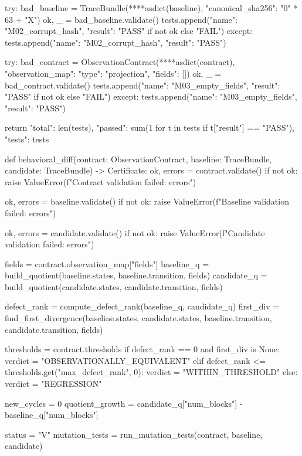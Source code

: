     try:
        bad_baseline = TraceBundle(**{**asdict(baseline), "canonical_sha256": "0" * 63 + "X"})
        ok, _ = bad_baseline.validate()
        tests.append({"name": "M02_corrupt_hash", "result": "PASS" if not ok else "FAIL"})
    except:
        tests.append({"name": "M02_corrupt_hash", "result": "PASS"})
    
    try:
        bad_contract = ObservationContract(**{**asdict(contract), "observation_map": {"type": "projection", "fields": []}})
        ok, _ = bad_contract.validate()
        tests.append({"name": "M03_empty_fields", "result": "PASS" if not ok else "FAIL"})
    except:
        tests.append({"name": "M03_empty_fields", "result": "PASS"})
    
    return {
        "total": len(tests),
        "passed": sum(1 for t in tests if t["result"] == "PASS"),
        "tests": tests
    }

def behavioral_diff(contract: ObservationContract, baseline: TraceBundle, 
                    candidate: TraceBundle) -> Certificate:
    ok, errors = contract.validate()
    if not ok:
        raise ValueError(f"Contract validation failed: {errors}")
    
    ok, errors = baseline.validate()
    if not ok:
        raise ValueError(f"Baseline validation failed: {errors}")
    
    ok, errors = candidate.validate()
    if not ok:
        raise ValueError(f"Candidate validation failed: {errors}")
    
    fields = contract.observation_map["fields"]
    baseline_q = build_quotient(baseline.states, baseline.transition, fields)
    candidate_q = build_quotient(candidate.states, candidate.transition, fields)
    
    defect_rank = compute_defect_rank(baseline_q, candidate_q)
    first_div = find_first_divergence(baseline.states, candidate.states, baseline.transition, candidate.transition, fields)
    
    thresholds = contract.thresholds
    if defect_rank == 0 and first_div is None:
        verdict = "OBSERVATIONALLY_EQUIVALENT"
    elif defect_rank <= thresholds.get("max_defect_rank", 0):
        verdict = "WITHIN_THRESHOLD"
    else:
        verdict = "REGRESSION"
    
    new_cycles = 0
    quotient_growth = candidate_q["num_blocks"] - baseline_q["num_blocks"]
    
    status = "V"
    mutation_tests = run_mutation_tests(contract, baseline, candidate)
    
